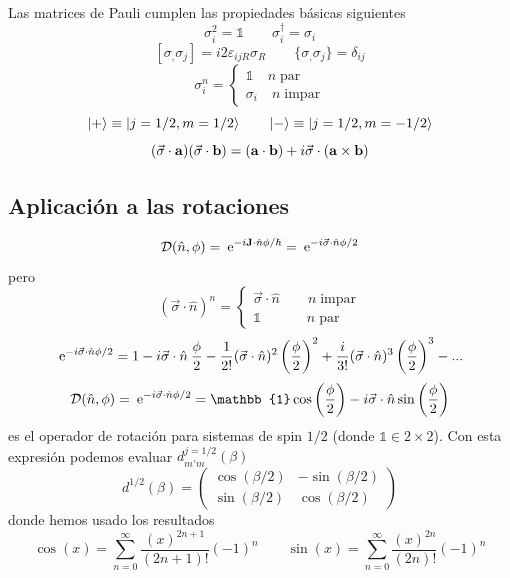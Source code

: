 \documentclass[10pt,oneside]{CBFT_book}
\begin{document}
Las matrices de Pauli cumplen las propiedades básicas siguientes 
\[
	\sigma^2_i = \mathbb{1} \qquad \sigma_i^\dagger = \sigma_i
\]
\[
	[ \sigma_, \sigma_j ] = i2\varepsilon_{ijR}\sigma_R \qquad \{\sigma_, \sigma_j \}= \delta_{ij}
\]
\[
	\sigma_i^n = \begin{cases} \mathbb{1} \quad n \; \text{par} \\ \sigma_i \quad n \; \text{impar} 
\end{cases}
\]
\[
	\Ket{+} \equiv \Ket{j=1/2 , m = 1/2} \qquad \Ket{-} \equiv \Ket{j=1/2 , m = -1/2} 
\]
\[
	(\vec{\sigma}\cdot\vb{a})(\vec{\sigma}\cdot\vb{b}) = 
		(\vb{a}\cdot\vb{b}) + i \vec{\sigma}\cdot(\vb{a}\times\vb{b})
\]

\subsection{Aplicación a las rotaciones}

\[
	\mathcal{D}(\hat{n},\phi) = \euler^{-i \vb{J}\cdot\hat{n}\phi/\hbar} = \euler^{-i\vec{\sigma}\cdot\hat{n}\phi/2}
\]
pero 
\[
	(\vec{\sigma}\cdot\hat{n})^n = \begin{cases}
	                                \vec{\sigma}\cdot\hat{n} \qquad n \; \text{impar} \\
	                                \mathbb{1} \qquad \quad \; n \; \text{par} 
	                               \end{cases}
\]
\[
	\:\mathrm{e}^{-i\vec{\sigma}\cdot\hat{n}\phi/2} = 1 - i\vec{\sigma}\cdot\hat{n} \:\frac{\phi}{2} - 
	\frac{1}{2!} (\vec{\sigma}\cdot\hat{n})^2\left(\frac{\phi}{2}\right)^2 + 
	\frac{i}{3!} (\vec{\sigma}\cdot\hat{n})^3\left(\frac{\phi}{2}\right)^3 - ...
\]
\[
	\mathcal{D}(\hat{n},\phi) = \euler^{-i\vec{\sigma}\cdot\hat{n}\phi/2} =
	\mathbb{1}\cos\left(\frac{\phi}{2}\right) - i\vec{\sigma}\cdot\hat{n}\sin\left(\frac{\phi}{2}\right)
\]
es el operador de rotación para sistemas de spin $1/2$ (donde $\mathbb{1} \in 2\times 2$). Con esta expresión podemos 
evaluar 
$d^{j=1/2}_{m'm}(\beta)$
\[
	d^{1/2}(\beta) = \begin{pmatrix}
	     \cos(\beta/2) & -\sin(\beta/2)\\
	     \sin(\beta/2) & \cos(\beta/2)
	    \end{pmatrix}
\]
donde hemos usado los resultados 
\[
	\cos(x) = \sum_{n=0}^\infty \frac{(x)^{2n+1}}{(2n+1)!}(-1)^n \qquad 
		\sin(x) = \sum_{n=0}^\infty \frac{(x)^{2n}}{(2n)!}(-1)^n
\]
\end{document}
